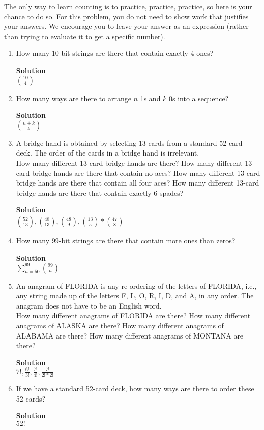 \documentclass[11pt]{article}
\newenvironment{Parts}{\begin{enumerate}[label=(\alph*)]}{\end{enumerate}}
\newcommand*{\Part}{\item}
\newenvironment{Answer}{\vspace{10pt}\begin{mdframed}\textbf{Solution}\\}{\end{mdframed}\vfill\pagebreak[3]}
\newenvironment{Answer}{\vspace{10pt}}{\vfill\pagebreak[3]}
\begin{document}
The only way to learn counting is to practice, practice, practice, so
here is your chance to do so.
For this problem, you do not need to show work that justifies your answers.
We encourage you to leave your answer as an expression (rather than
trying to evaluate it to get a specific number).
\begin{Parts}
\Part How many 10-bit strings are there that contain exactly 4 ones?
\begin{Answer}
$\binom{10}{4}$
\end{Answer}

\Part How many ways are there to arrange $n$ 1s and $k$ 0s into a sequence?
\begin{Answer}
$\binom{n+k}{k}$
\end{Answer}

\Part A bridge hand is obtained by selecting 13 cards from a standard
  52-card deck. The order of the cards in a bridge hand is
  irrelevant. \\
  How many different 13-card bridge hands are there? 
  How many different 13-card bridge hands are there that contain
  no aces? How many different 13-card bridge hands are there that contain
  all four aces? How many different 13-card bridge hands are there that contain
  exactly 6 spades?
\begin{Answer}
$\binom{52}{13}, \binom{48}{13}, \binom{48}{9}, \binom{13}{5}*\binom{47}{8}$
\end{Answer}

\Part How many 99-bit strings are there that contain more ones than
  zeros?
\begin{Answer}
$\sum_{n=50}^{99} \binom{99}{n}$
\end{Answer}
 
\Part An anagram of FLORIDA is any re-ordering of the letters of FLORIDA, i.e., any
  string made up of the letters F, L, O, R, I, D, and A, in any order.
  The anagram does not have to be an English word. \\
  How many different anagrams of FLORIDA are there? How many different anagrams 
  of ALASKA are there? How many different anagrams of ALABAMA are there? 
  How many different anagrams of MONTANA are there?
\begin{Answer}
$7!, \frac{6!}{3!}, \frac{7!}{4!}, \frac{7!}{2!*2!}$
\end{Answer}

\Part If we have a standard 52-card deck, how many ways are there to
  order these 52 cards?
\begin{Answer}
$52!$
\end{Answer}


\end{Parts}
\end{document}
